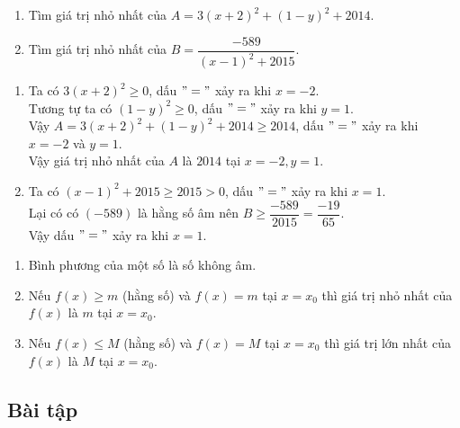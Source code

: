 \begin{vd}%
	\begin{enumerate}
		\item Tìm giá trị nhỏ nhất của $A=3(x+2)^2+(1-y)^2+2014$.
		\item Tìm giá trị nhỏ nhất của $B=\dfrac{-589}{(x-1)^2+2015}$.
	\end{enumerate}
	\loigiai
	{
		\begin{enumerate}
			\item Ta có $3(x+2)^2 \ge 0$, dấu $"="$ xảy ra khi $x=-2$.\\
			Tương tự ta có $(1-y)^2 \ge 0$, dấu $"="$ xảy ra khi $y=1$.\\
			Vậy $A=3(x+2)^2+(1-y)^2+2014 \ge 2014$, dấu $"="$ xảy ra khi $x=-2$ và $y=1$.\\
			Vậy giá trị nhỏ nhất của $A$ là $2014$ tại $x=-2,y=1$.
			\item Ta có $(x-1)^2+2015 \ge 2015 >0$, dấu $"="$ xảy ra khi $x=1$.\\
			Lại có có $(-589)$ là hằng số âm nên $B \ge \dfrac{-589}{2015} =\dfrac{-19}{65}$.\\
			Vậy dấu $"="$ xảy ra khi $x=1$.\\
		\end{enumerate}
	\begin{note}
		\begin{enumerate}
			\item Bình phương của một số là số không âm.
			\item Nếu $f(x) \ge m$ (hằng số) và $f(x)=m$ tại $x=x_0$ thì giá trị nhỏ nhất của $f(x)$ là $m$ tại $x=x_0$.
			\item Nếu $f(x) \le M$ (hằng số) và $f(x)=M$ tại $x=x_0$ thì giá trị lớn nhất của $f(x)$ là $M$ tại $x=x_0$.
		\end{enumerate}
	\end{note}
	}
\end{vd}

\subsection{Bài tập}

